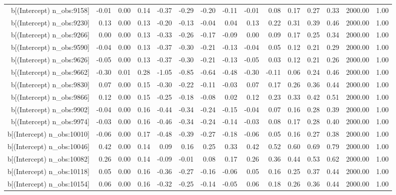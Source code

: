 \begin{table}[ht]
\begin{tabular}{rrrrrrrrrrrrrrr}
  b[(Intercept) n\_obs:9158] & -0.01 & 0.00 & 0.14 & -0.37 & -0.29 & -0.20 & -0.11 & -0.01 & 0.08 & 0.17 & 0.27 & 0.33 & 2000.00 & 1.00 \\ 
  b[(Intercept) n\_obs:9230] & 0.13 & 0.00 & 0.13 & -0.20 & -0.13 & -0.04 & 0.04 & 0.13 & 0.22 & 0.31 & 0.39 & 0.46 & 2000.00 & 1.00 \\ 
  b[(Intercept) n\_obs:9266] & 0.00 & 0.00 & 0.13 & -0.33 & -0.26 & -0.17 & -0.09 & 0.00 & 0.09 & 0.17 & 0.25 & 0.34 & 2000.00 & 1.00 \\ 
  b[(Intercept) n\_obs:9590] & -0.04 & 0.00 & 0.13 & -0.37 & -0.30 & -0.21 & -0.13 & -0.04 & 0.05 & 0.12 & 0.21 & 0.29 & 2000.00 & 1.00 \\ 
  b[(Intercept) n\_obs:9626] & -0.05 & 0.00 & 0.13 & -0.37 & -0.30 & -0.21 & -0.13 & -0.05 & 0.03 & 0.12 & 0.21 & 0.26 & 2000.00 & 1.00 \\ 
  b[(Intercept) n\_obs:9662] & -0.30 & 0.01 & 0.28 & -1.05 & -0.85 & -0.64 & -0.48 & -0.30 & -0.11 & 0.06 & 0.24 & 0.46 & 2000.00 & 1.00 \\ 
  b[(Intercept) n\_obs:9830] & 0.07 & 0.00 & 0.15 & -0.30 & -0.22 & -0.11 & -0.03 & 0.07 & 0.17 & 0.26 & 0.36 & 0.44 & 2000.00 & 1.00 \\ 
  b[(Intercept) n\_obs:9866] & 0.12 & 0.00 & 0.15 & -0.25 & -0.18 & -0.08 & 0.02 & 0.12 & 0.23 & 0.33 & 0.42 & 0.51 & 2000.00 & 1.00 \\ 
  b[(Intercept) n\_obs:9902] & -0.04 & 0.00 & 0.16 & -0.44 & -0.34 & -0.24 & -0.15 & -0.04 & 0.07 & 0.16 & 0.28 & 0.39 & 2000.00 & 1.00 \\ 
  b[(Intercept) n\_obs:9974] & -0.03 & 0.00 & 0.16 & -0.46 & -0.34 & -0.24 & -0.14 & -0.03 & 0.08 & 0.17 & 0.28 & 0.40 & 2000.00 & 1.00 \\ 
  b[(Intercept) n\_obs:10010] & -0.06 & 0.00 & 0.17 & -0.48 & -0.39 & -0.27 & -0.18 & -0.06 & 0.05 & 0.16 & 0.27 & 0.38 & 2000.00 & 1.00 \\ 
  b[(Intercept) n\_obs:10046] & 0.42 & 0.00 & 0.14 & 0.09 & 0.16 & 0.25 & 0.33 & 0.42 & 0.52 & 0.60 & 0.69 & 0.79 & 2000.00 & 1.00 \\ 
  b[(Intercept) n\_obs:10082] & 0.26 & 0.00 & 0.14 & -0.09 & -0.01 & 0.08 & 0.17 & 0.26 & 0.36 & 0.44 & 0.53 & 0.62 & 2000.00 & 1.00 \\ 
  b[(Intercept) n\_obs:10118] & 0.05 & 0.00 & 0.16 & -0.36 & -0.27 & -0.16 & -0.06 & 0.05 & 0.16 & 0.25 & 0.37 & 0.44 & 2000.00 & 1.00 \\ 
  b[(Intercept) n\_obs:10154] & 0.06 & 0.00 & 0.16 & -0.32 & -0.25 & -0.14 & -0.05 & 0.06 & 0.18 & 0.26 & 0.36 & 0.44 & 2000.00 & 1.00 \\ 

\end{tabular}
\end{table}
